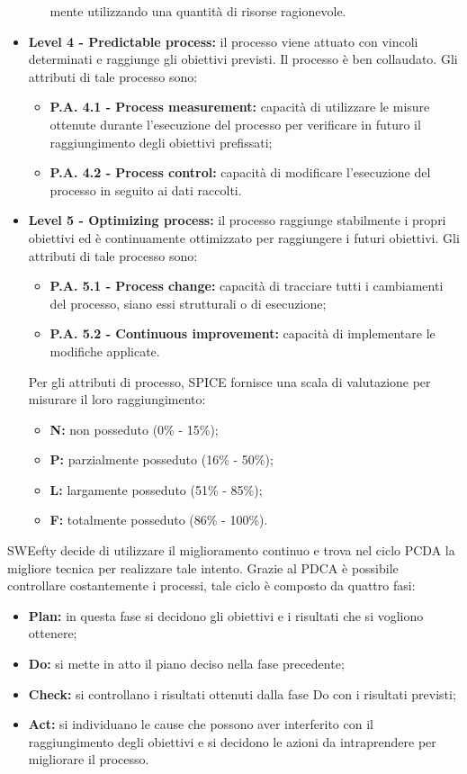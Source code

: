 \begin{itemize}
\begin{itemize}
			mente utilizzando una quantità di risorse ragionevole.
		\end{itemize}
	\item \textbf{Level 4 - Predictable process:}
		il processo viene attuato con vincoli determinati  e  raggiunge  gli  obiettivi  previsti. Il processo è ben collaudato. Gli attributi di tale processo sono:
		\begin{itemize}
			\item \textbf{P.A. 4.1 - Process measurement:}
			capacità  di  utilizzare  le  misure ottenute durante l’esecuzione del processo per verificare in futuro il raggiungimento degli obiettivi prefissati;
			\item \textbf{P.A. 4.2 - Process control:}
			capacità  di  modificare  l’esecuzione  del processo in seguito ai dati raccolti.
		\end{itemize}
	\item \textbf{Level 5 - Optimizing process:}
		il processo raggiunge stabilmente i propri obiettivi ed è continuamente ottimizzato per raggiungere i futuri obiettivi.
		Gli attributi di tale processo sono:
		\begin{itemize}
			\item \textbf{P.A. 5.1 - Process change:}
			capacità di tracciare tutti i cambiamenti del processo, siano essi strutturali o di esecuzione;
			\item \textbf{P.A. 5.2 - Continuous improvement:}
			capacità di implementare le modifiche applicate.
		\end{itemize}

		Per gli attributi di processo, SPICE fornisce una scala di valutazione per misurare il loro raggiungimento:
		\begin{itemize}
			\item \textbf{N:} non posseduto (0\% - 15\%);
			\item \textbf{P:} parzialmente posseduto (16\% - 50\%);
			\item \textbf{L:} largamente posseduto (51\% - 85\%);
			\item \textbf{F:} totalmente posseduto (86\% - 100\%).
		\end{itemize}
\end{itemize}
	SWEefty decide di utilizzare il miglioramento continuo e trova nel ciclo PCDA la migliore tecnica per realizzare tale intento.
	Grazie al PDCA è possibile controllare costantemente i processi, tale ciclo è composto da quattro fasi:
	\begin{itemize}
		\item \textbf{Plan:} in questa fase si decidono gli obiettivi e i risultati che si vogliono ottenere;
		\item \textbf{Do:} si mette in atto il piano deciso nella fase precedente;	
		\item \textbf{Check:} si controllano i risultati ottenuti dalla fase Do con i risultati previsti;
		\item \textbf{Act:} si individuano le cause che possono aver interferito con il raggiungimento degli obiettivi e si decidono le azioni da intraprendere per migliorare il processo.
	\end{itemize}

